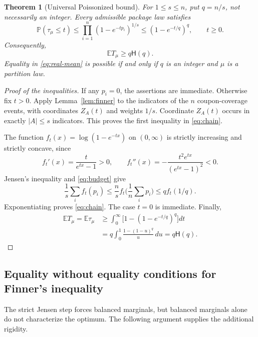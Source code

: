 \documentclass[11pt]{article}
\numberwithin{equation}{section}
\newtheorem{theorem}{Theorem}[section]
\theoremstyle{remark}
\newcommand{\Pp}{\mathbb P}
\newcommand{\E}{\mathbb E}
\newcommand{\1}{\mathbf 1}
\newcommand{\hreal}{\mathsf H}
\begin{document}
\begin{theorem}[Universal Poissonized bound]\label{thm:universal}
For $1\leq s\leq n$, put $q=n/s$, not necessarily an integer. Every admissible package law satisfies
\begin{equation}\label{eq:chain}
 \Pp(\tau_\mu\leq t)
 \leq\prod_{i=1}^n(1-e^{-tp_i})^{1/s}
 \leq(1-e^{-t/q})^q,
 \qquad t\geq0.
\end{equation}
Consequently,
\begin{equation}\label{eq:real-mean}
 \E T_\mu\geq q\hreal(q).
\end{equation}
Equality in \eqref{eq:real-mean} is possible if and only if $q$ is an integer and $\mu$ is a partition law.
\end{theorem}

\begin{proof}[Proof of the inequalities]
If any $p_i=0$, the assertions are immediate. Otherwise fix $t>0$. Apply Lemma~\ref{lem:finner} to the indicators of the $n$ coupon-coverage events, with coordinates $Z_A(t)$ and weights $1/s$. Coordinate $Z_A(t)$ occurs in exactly $|A|\leq s$ indicators. This proves the first inequality in \eqref{eq:chain}.

The function $f_t(x)=\log(1-e^{-tx})$ on $(0,\infty)$ is strictly increasing and strictly concave, since
\[
 f_t'(x)=\frac{t}{e^{tx}-1}>0,
 \qquad
 f_t''(x)=-\frac{t^2e^{tx}}{(e^{tx}-1)^2}<0.
\]
Jensen's inequality and \eqref{eq:budget} give
\[
 \frac1s\sum_i f_t(p_i)
 \leq \frac ns f_t\biggl(\frac1n\sum_i p_i\biggr)
 \leq q f_t(1/q).
\]
Exponentiating proves \eqref{eq:chain}. The case $t=0$ is immediate. Finally,
\begin{align*}
 \E T_\mu=\E\tau_\mu
 &\geq\int_0^\infty\bigl[1-(1-e^{-t/q})^q\bigr]dt\\
 &=q\int_0^1\frac{1-(1-u)^q}{u}\,du
 =q\hreal(q).
\end{align*}
\end{proof}

\subsection{Equality without equality conditions for Finner's inequality}\label{subsec:equality}

The strict Jensen step forces balanced marginals, but balanced marginals alone do not characterize the optimum. The following argument supplies the additional rigidity.
\end{document}
